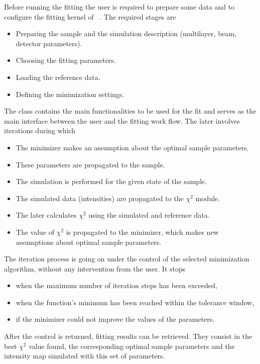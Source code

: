 Before running the fitting the user is required to prepare some  data and to
configure the fitting kernel of \BornAgain\ . The required stages are

\begin{itemize}
\item Preparing the sample and the simulation description (multilayer, beam, detector parameters).
\item Choosing the fitting parameters.
\item Loading the reference data.
\item Defining the minimization settings.
\end{itemize}

The class  contains the main functionalities to be used for the fit
and serves as the main interface between the user and the fitting work flow. 
The later involves iterations during which

\begin{itemize}
\item The minimizer makes an assumption about the optimal sample parameters.
\item These parameters are propagated to the sample.
\item The simulation is performed for the given state of the sample.
\item The simulated data (intensities) are propagated to the $\chi^2$ module.
\item The later calculates $\chi^2$ using the simulated and reference data.
\item The value of $\chi^2$ is propagated to the minimizer, which makes new assumptions about optimal sample parameters.
\end{itemize}

The iteration process is going on under the control of the selected minimization
algorithm, without any intervention from the
user. It stops 
\begin{itemize}
\item when the maximum number of iteration steps has been exceeded,
\item when the function's minimum has been reached within the tolerance window,
\item if the minimizer could not improve the values of the parameters. 
\end{itemize}

After the control is returned, fitting results can be retrieved.
They consist in the best $\chi^2$ value found, the corresponding
optimal sample parameters and the intensity map simulated with this set of parameters.

